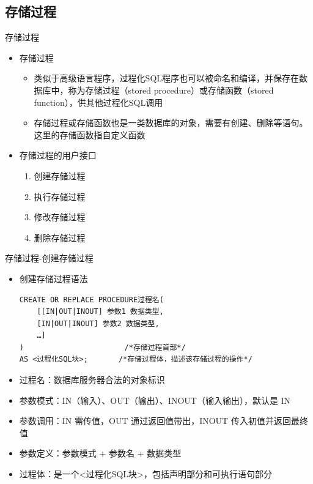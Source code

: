 \subsection{存储过程}
\begin{frame}{存储过程}
\begin{itemize}
    \item 存储过程
    \begin{itemize}
        \item 类似于高级语言程序，过程化SQL程序也可以被命名和编译，并保存在数据库中，称为存储过程（stored procedure）或存储函数（stored function），供其他过程化SQL调用
        \item 存储过程或存储函数也是一类数据库的对象，需要有创建、删除等语句。这里的存储函数指自定义函数
    \end{itemize}
    \item 存储过程的用户接口
    \begin{enumerate}
        \item 创建存储过程
        \item 执行存储过程 
        \item 修改存储过程
        \item 删除存储过程 
    \end{enumerate}
\end{itemize}
\end{frame}

\begin{frame}[fragile]{存储过程-创建存储过程}
\begin{itemize}
    \item 创建存储过程语法
\begin{block}{}
\begin{lstlisting}[linewidth=\linewidth]
CREATE OR REPLACE PROCEDURE过程名(
    [[IN|OUT|INOUT] 参数1 数据类型,
    [IN|OUT|INOUT] 参数2 数据类型,
    …]
)                       /*存储过程首部*/ 
AS <过程化SQL块>;       /*存储过程体，描述该存储过程的操作*/
\end{lstlisting}
\end{block} 
    \item 过程名：数据库服务器合法的对象标识
    \item 参数模式：IN（输入）、OUT（输出）、INOUT（输入输出），默认是 IN
    \item 参数调用：IN 需传值，OUT 通过返回值带出，INOUT 传入初值并返回最终值
    \item 参数定义：参数模式 + 参数名 + 数据类型
    \item 过程体：是一个<过程化SQL块>，包括声明部分和可执行语句部分 
\end{itemize}
\end{frame}

